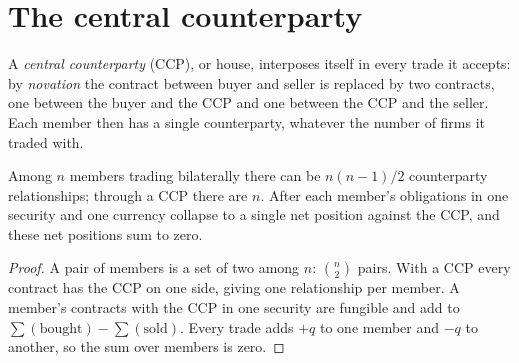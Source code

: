 \section{The central counterparty}

\begin{definition}\label{def:m1:clearing-and-settlement:ccp}
A \emph{central counterparty} (CCP), or 
house, interposes itself in every trade it accepts: by
\emph{novation} the contract between buyer and seller is
replaced by two contracts, one between the buyer and the CCP and one between
the CCP and the seller. Each member then has a single counterparty, whatever
the number of firms it traded with.
\end{definition}

\begin{proposition}\label{prop:m1:clearing-and-settlement:network}
Among $n$ members trading bilaterally there can be $n(n-1)/2$ counterparty
relationships; through a CCP there are $n$. After  each member's
obligations in one security and one currency collapse to a single net
position against the CCP, and these net positions sum to zero.
\end{proposition}
\begin{proof}
A pair of members is a set of two among $n$: $\binom n2$ pairs. With a CCP
every contract has the CCP on one side, giving one relationship per member.
A member's contracts with the CCP in one security are fungible and add to
$\sum(\text{bought}) - \sum(\text{sold})$. Every trade adds $+q$ to one
member and $-q$ to another, so the sum over members is zero.
\end{proof}

\begin{omfigure}

\end{omfigure}

